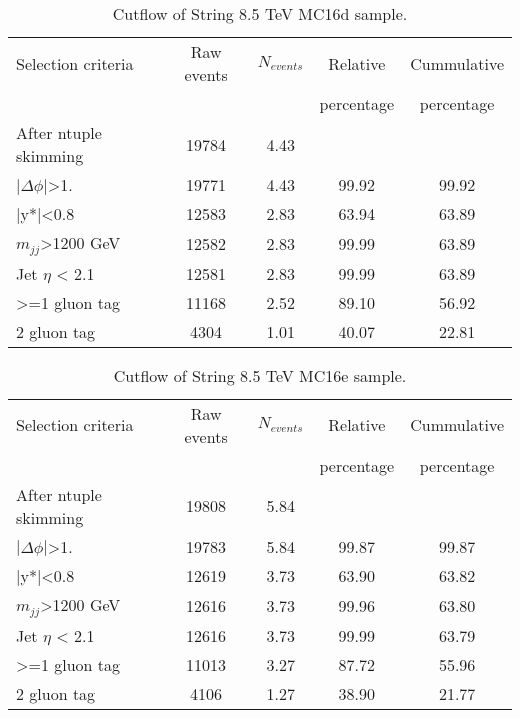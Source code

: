 \begin{table}[ht]
\begin{center}
\begin{tabular}{|l|c|c|c|c|}
\hline
Selection criteria & Raw events & $N_{events}$ & Relative & Cummulative \\
 & & & percentage & percentage \\
\hline
After ntuple skimming & 19784 & 4.43 &  &  \\
$|\Delta\phi|$>1.& 19771 & 4.43 & 99.92 & 99.92 \\
|y*|<0.8 & 12583 & 2.83 & 63.94 & 63.89 \\
$m_{jj}$>1200 GeV & 12582 & 2.83 & 99.99 & 63.89 \\
Jet $\eta$ < 2.1 & 12581 & 2.83 & 99.99 & 63.89 \\
>=1 gluon tag & 11168 & 2.52 & 89.10 & 56.92 \\
2 gluon tag & 4304 & 1.01 & 40.07 & 22.81 \\
\hline
\end{tabular}
\end{center}
\caption{Cutflow of String 8.5 TeV MC16d sample.}
\end{table}

\begin{table}[ht]
\begin{center}
\begin{tabular}{|l|c|c|c|c|}
\hline
Selection criteria & Raw events & $N_{events}$ & Relative & Cummulative \\
 & & & percentage & percentage \\
\hline
After ntuple skimming & 19808 & 5.84 &  &  \\
$|\Delta\phi|$>1. & 19783 & 5.84 & 99.87 & 99.87 \\
|y*|<0.8 & 12619 & 3.73 & 63.90 & 63.82 \\
$m_{jj}$>1200 GeV & 12616 & 3.73 & 99.96 & 63.80 \\
Jet $\eta$ < 2.1 & 12616 & 3.73 & 99.99 & 63.79 \\
>=1 gluon tag & 11013 & 3.27 & 87.72 & 55.96 \\
2 gluon tag & 4106 & 1.27 & 38.90 & 21.77 \\
\hline
\end{tabular}
\end{center}
\caption{Cutflow of String 8.5 TeV MC16e sample.}
\end{table}

